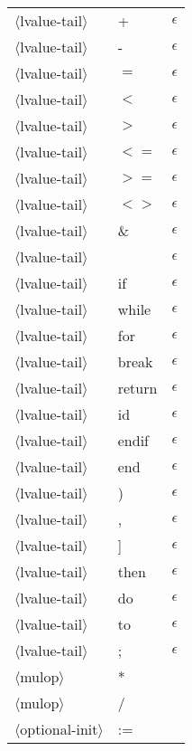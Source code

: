 \documentclass[11pt, fleqn]{article}
\newcommand{\atag}[1]{$\langle$#1$\rangle$}
\begin{document}
\begin{longtable}{l|l|l}
\atag{lvalue-tail}				&	+		&	$\epsilon$											\\
\atag{lvalue-tail}				&	-		&	$\epsilon$											\\
\atag{lvalue-tail}				&	$=$		&	$\epsilon$											\\
\atag{lvalue-tail}				&	$<$		&	$\epsilon$											\\
\atag{lvalue-tail}				&	$>$		&	$\epsilon$											\\
\atag{lvalue-tail}				&	$<=$		&	$\epsilon$											\\
\atag{lvalue-tail}				&	$>=$		&	$\epsilon$											\\
\atag{lvalue-tail}				&	$<>$		&	$\epsilon$											\\
\atag{lvalue-tail}				&	\&		&	$\epsilon$											\\
\atag{lvalue-tail}				&	\textbar		&	$\epsilon$											\\
\atag{lvalue-tail}				&	if		&		$\epsilon$										\\
\atag{lvalue-tail}				&	while		&		$\epsilon$										\\
\atag{lvalue-tail}				&	for		&		$\epsilon$										\\
\atag{lvalue-tail}				&	break		&	$\epsilon$											\\
\atag{lvalue-tail}				&	return		&	$\epsilon$											\\
\atag{lvalue-tail}				&	id		&		$\epsilon$										\\
\atag{lvalue-tail}				&	endif		&	$\epsilon$											\\
\atag{lvalue-tail}				&	end		&		$\epsilon$										\\
\atag{lvalue-tail}				&	)		&	$\epsilon$											\\
\atag{lvalue-tail}				&	,		&	$\epsilon$											\\
\atag{lvalue-tail}				&	]		&	$\epsilon$											\\
\atag{lvalue-tail}				&	then		&	$\epsilon$											\\
\atag{lvalue-tail}				&	do		&	$\epsilon$											\\
\atag{lvalue-tail}				&	to		&	$\epsilon$											\\
\atag{lvalue-tail}				&	;		&	$\epsilon$											\\
\atag{mulop}						&	*		&														\\
\atag{mulop}						&	/		&														\\
\atag{optional-init}				&	:=		&		\\

\end{longtable}
\end{document}
